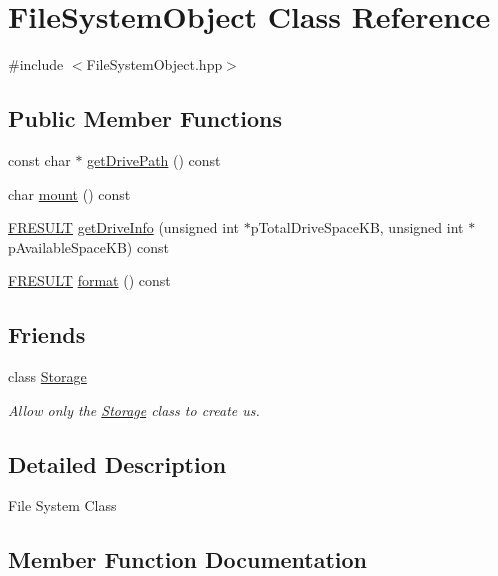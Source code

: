 \hypertarget{classFileSystemObject}{}\section{File\+System\+Object Class Reference}
\label{classFileSystemObject}


{\ttfamily \#include $<$File\+System\+Object.\+hpp$>$}

\subsection*{Public Member Functions}
\begin{DoxyCompactItemize}
\item 
const char $\ast$ \hyperlink{classFileSystemObject_a02e3883dba58c16f28c351f56a7bf8e3}{get\+Drive\+Path} () const 
\item 
char \hyperlink{classFileSystemObject_afa103b2854558978188f848153daceae}{mount} () const 
\item 
\hyperlink{ff_8h_a49d0171ecbd362cda5680a0d360db44c}{F\+R\+E\+S\+U\+LT} \hyperlink{classFileSystemObject_a80f0f7f312563128d41bf3481723b028}{get\+Drive\+Info} (unsigned int $\ast$p\+Total\+Drive\+Space\+KB, unsigned int $\ast$p\+Available\+Space\+KB) const 
\item 
\hyperlink{ff_8h_a49d0171ecbd362cda5680a0d360db44c}{F\+R\+E\+S\+U\+LT} \hyperlink{classFileSystemObject_a8c5167c7d5d659eeadb799b2c27b041d}{format} () const 
\end{DoxyCompactItemize}
\subsection*{Friends}
\begin{DoxyCompactItemize}
\item 
class \hyperlink{classFileSystemObject_ab647623b3295040f83d3afb2a502a223}{Storage}
\begin{DoxyCompactList}\small\item\em Allow only the \hyperlink{classStorage}{Storage} class to create us. \end{DoxyCompactList}\end{DoxyCompactItemize}


\subsection{Detailed Description}
File System Class 

\subsection{Member Function Documentation}
